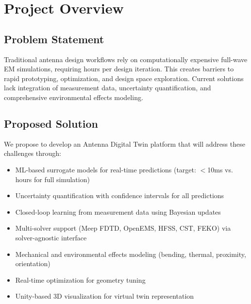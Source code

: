 \documentclass[11pt]{article}
\begin{document}
\section{Project Overview}

\subsection{Problem Statement}
Traditional antenna design workflows rely on computationally expensive full-wave EM simulations, requiring hours per design iteration. This creates barriers to rapid prototyping, optimization, and design space exploration. Current solutions lack integration of measurement data, uncertainty quantification, and comprehensive environmental effects modeling.

\subsection{Proposed Solution}
We propose to develop an Antenna Digital Twin platform that will address these challenges through:
\begin{itemize}
    \item ML-based surrogate models for real-time predictions (target: $<$10ms vs. hours for full simulation)
    \item Uncertainty quantification with confidence intervals for all predictions
    \item Closed-loop learning from measurement data using Bayesian updates
    \item Multi-solver support (Meep FDTD, OpenEMS, HFSS, CST, FEKO) via solver-agnostic interface
    \item Mechanical and environmental effects modeling (bending, thermal, proximity, orientation)
    \item Real-time optimization for geometry tuning
    \item Unity-based 3D visualization for virtual twin representation
\end{itemize}
\end{document}
